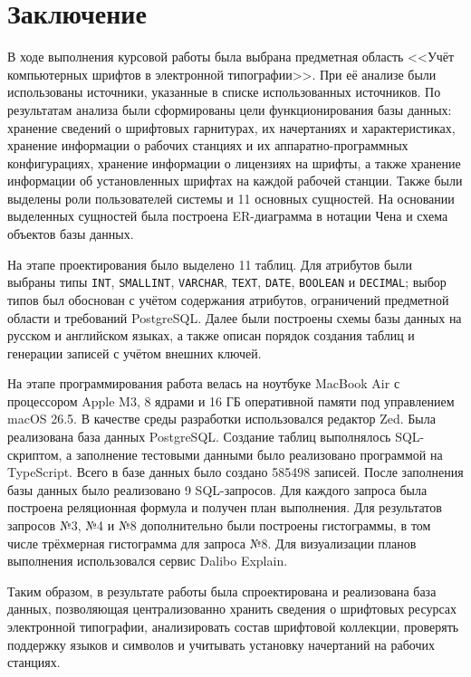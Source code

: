 \section*{Заключение}

В ходе выполнения курсовой работы была выбрана предметная область <<Учёт компьютерных шрифтов в электронной типографии>>. При её анализе были использованы источники, указанные в списке использованных источников. По результатам анализа были сформированы цели функционирования базы данных: хранение сведений о шрифтовых гарнитурах, их начертаниях и характеристиках, хранение информации о рабочих станциях и их аппаратно-программных конфигурациях, хранение информации о лицензиях на шрифты, а также хранение информации об установленных шрифтах на каждой рабочей станции. Также были выделены роли пользователей системы и 11 основных сущностей. На основании выделенных сущностей была построена ER-диаграмма в нотации Чена и схема объектов базы данных.

На этапе проектирования было выделено 11 таблиц. Для атрибутов были выбраны типы \texttt{INT}, \texttt{SMALLINT}, \texttt{VARCHAR}, \texttt{TEXT}, \texttt{DATE}, \texttt{BOOLEAN} и \texttt{DECIMAL}; выбор типов был обоснован с учётом содержания атрибутов, ограничений предметной области и требований PostgreSQL. Далее были построены схемы базы данных на русском и английском языках, а также описан порядок создания таблиц и генерации записей с учётом внешних ключей.

На этапе программирования работа велась на ноутбуке MacBook Air с процессором Apple M3, 8 ядрами и 16 ГБ оперативной памяти под управлением macOS 26.5. В качестве среды разработки использовался редактор Zed. Была реализована база данных PostgreSQL. Создание таблиц выполнялось SQL-скриптом, а заполнение тестовыми данными было реализовано программой на TypeScript. Всего в базе данных было создано 585498 записей. После заполнения базы данных было реализовано 9 SQL-запросов. Для каждого запроса была построена реляционная формула и получен план выполнения. Для результатов запросов №3, №4 и №8 дополнительно были построены гистограммы, в том числе трёхмерная гистограмма для запроса №8. Для визуализации планов выполнения использовался сервис Dalibo Explain.

Таким образом, в результате работы была спроектирована и реализована база данных, позволяющая централизованно хранить сведения о шрифтовых ресурсах электронной типографии, анализировать состав шрифтовой коллекции, проверять поддержку языков и символов и учитывать установку начертаний на рабочих станциях.
